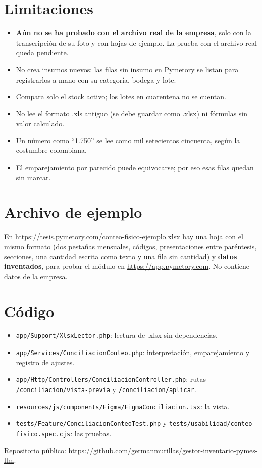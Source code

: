 \documentclass[letterpaper,11pt]{article}
\begin{document}
\section{Limitaciones}

\begin{itemize}[nosep]
\item \textbf{Aún no se ha probado con el archivo real de la empresa}, solo con la transcripción de su foto y con hojas de ejemplo. La prueba con el archivo real queda pendiente.
\item No crea insumos nuevos: las filas sin insumo en Pymetory se listan para registrarlos a mano con su categoría, bodega y lote.
\item Compara solo el stock activo; los lotes en cuarentena no se cuentan.
\item No lee el formato .xls antiguo (se debe guardar como .xlsx) ni fórmulas sin valor calculado.
\item Un número como ``1.750'' se lee como mil setecientos cincuenta, según la costumbre colombiana.
\item El emparejamiento por parecido puede equivocarse; por eso esas filas quedan sin marcar.
\end{itemize}

\section{Archivo de ejemplo}

En \url{https://tesis.pymetory.com/conteo-fisico-ejemplo.xlsx} hay una hoja con el mismo formato (dos pestañas mensuales, códigos, presentaciones entre paréntesis, secciones, una cantidad escrita como texto y una fila sin cantidad) y \textbf{datos inventados}, para probar el módulo en \url{https://app.pymetory.com}. No contiene datos de la empresa.

\section{Código}

\begin{itemize}[nosep]
\item \texttt{app/Support/XlsxLector.php}: lectura de .xlsx sin dependencias.
\item \texttt{app/Services/ConciliacionConteo.php}: interpretación, emparejamiento y registro de ajustes.
\item \texttt{app/Http/Controllers/ConciliacionController.php}: rutas \texttt{/conciliacion/vista-previa} y \texttt{/conciliacion/aplicar}.
\item \texttt{resources/js/components/Figma/FigmaConciliacion.tsx}: la vista.
\item \texttt{tests/Feature/ConciliacionConteoTest.php} y \texttt{tests/usabilidad/conteo-fisico.spec.cjs}: las pruebas.
\end{itemize}

Repositorio público: \url{https://github.com/germanmurillas/gestor-inventario-pymes-llm}.
\end{document}
